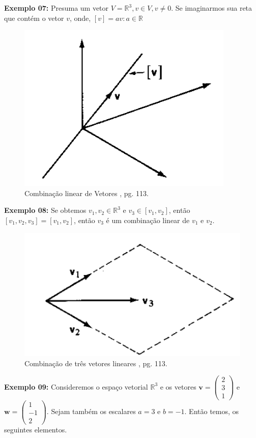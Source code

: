 \noindent\textbf{Exemplo 07:} Presuma um vetor $V = \mathbb{R}^3, v \in V, v \neq 0$. Se imaginarmos sua reta que contém o vetor $v$, onde, $[v] = {av: a \in \mathbb{R}}$

\begin{figure}[H]
	\centering
	\includegraphics[scale=0.90]{cb_exemplo7.png}
	\caption{Combinação linear de Vetores \cite{boldrini1980}, pg. 113.}
\end{figure}

\noindent\textbf{Exemplo 08:} Se obtemos $v_1, v_2 \in \mathbb{R}^3$ e $v_3 \in [v_1, v_2]$, então $[v_1, v_2, v_3] = [v_1, v_2]$, então $v_3$ é um combinação linear de  $v_1$ e $v_2$.

\begin{figure}[H]
	\centering
	\includegraphics[scale=0.90]{cb_exemplo8.png}
	\caption{Combinação de três vetores lineares \cite{boldrini1980}, pg. 113.}
\end{figure}

\noindent\textbf{Exemplo 09:} Consideremos o espaço vetorial $\mathbb{R}^3$ e os vetores $\mathbf{v} = \begin{pmatrix} 2 \\ 3 \\ 1 \end{pmatrix}$ e $\mathbf{w} = \begin{pmatrix} 1 \\ -1 \\ 2 \end{pmatrix}$. Sejam também os escalares $a = 3$ e $b = -1$. Então temos, os seguintes elementos.

